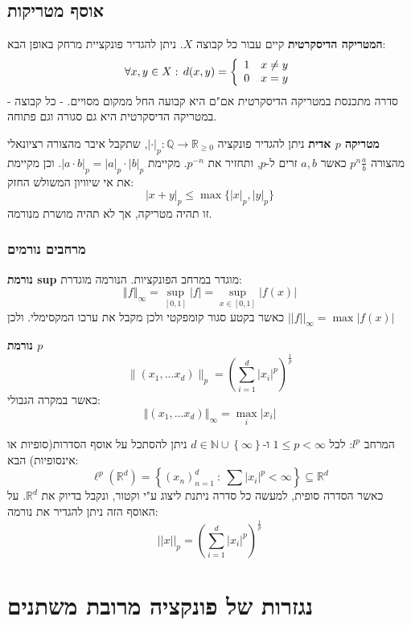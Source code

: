 \documentclass{tstextbook}
\begin{document}
\subsection{אוסף מטריקות}

\textbf{המטריקה הדיסקרטית}
קיים עבור כל קבוצה \(X\). ניתן להגדיר פונקציית מרחק באופן הבא:
$$\forall x,y\in X:\,d(x,y)={\left\{\begin{array}{l l}{1}&{x\neq y}\\ {0}&{x=y}\end{array}\right.}$$
- סדרה מתכנסת במטריקה הדיסקרטית אם"ם היא קבועה החל ממקום מסויים.
- כל קבוצה במטריקה הדיסקרטית היא גם סגורה וגם פתוחה.

\textbf{מטריקה \(p\) אדית}
ניתן להגדיר פונקציה \(|\cdot|_{p}:\mathbb{Q}\to \mathbb{R}_{\geq 0}\), שתקבל איבר מהצורה רציונאלי מהצורה \(p^n \frac{a}{b}\) כאשר \(a,b\) זרים ל-\(p\), ותחזיר את \(p^{-n}\). מקיימת \(|a\cdot b|_{p}=|a|_{p}\cdot |b|_{p}\). וכן מקיימת את אי שיוויון המשולש החזק:
$$|x+y|_{p}\leq \max \{ |x|_{p},|y|_{p} \}$$
זו תהיה מטריקה, אך לא תהיה מושרת מנורמה.

\subsubsection{מרחבים נורמים}

\textbf{נורמת sup}
מוגדר במרחב הפונקציות. הנורמה מוגדרת:
$$\left\Vert{f}\right\Vert_{\infty}=\operatorname*{sup}_{[0,1]}\left\vert{f}\right\vert=\operatorname*{sup}_{x\in[0,1]}\left\vert{f}\left(x\right)\right\vert$$
כאשר בקטע סגור קומפקטי ולכן מקבל את ערכו המקסימלי. ולכן \(||f||_{\infty}=\max|f(x)|\)

\textbf{נורמת \(p\)}$$\|(x_{1},...x_{d})\|_{p}=\left(\sum_{i=1}^{d}|x_{i}|^{p}\right)^{\frac{1}{p}}$$
כאשר במקרה הגבולי:
$$\left\Vert(x_{1},...x_{d})\right\Vert_{\infty}=\operatorname*{max}_{i}\left\vert x_{i}\right\vert$$

המרחב \(l^p\):
לכל \(1\leq p<\infty\) ו-\(d\in\mathbb{N}\cup \left\{  \infty  \right\}\) ניתן להסתכל על אוסף הסדרות(סופיות או אינסופיות) הבא:
$$\ell^{p}\left(\mathbb{R}^{d}\right)=\left\{\left(x_{n}\right)_{n=1}^{d}\ :\ \sum|x_{i}|^{p}<\infty\right\}\subseteq\mathbb{R}^{d}$$
כאשר הסדרה סופית, למעשה כל סדרה ניתנת ליצוג ע"י וקטור, ונקבל בדיוק את \(\mathbb{R}^d\). על האוסף הזה ניתן להגדיר את נורמה:
$$||x||_{p}=\left(\sum_{i=1}^{d}|x_{i}|^{p}\right)^{\frac{1}{p}}$$

\section{נגזרות של פונקציה מרובת משתנים}
\end{document}
